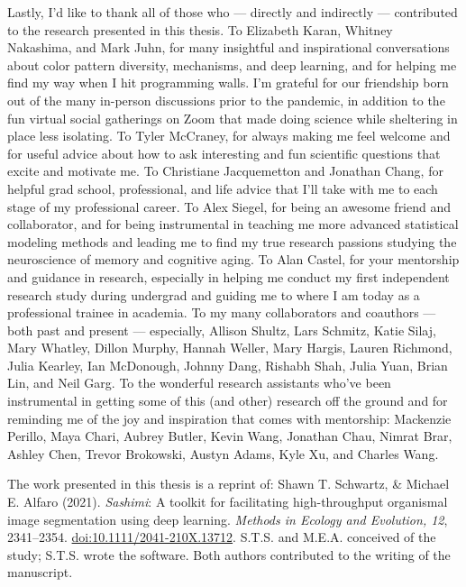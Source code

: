{Lastly, I'd like to thank all of those who --- directly and indirectly --- contributed to the research presented in this thesis. To Elizabeth Karan, Whitney Nakashima, and Mark Juhn, for many insightful and inspirational conversations about color pattern diversity, mechanisms, and deep learning, and for helping me find my way when I hit programming walls. I'm grateful for our friendship born out of the many in-person discussions prior to the pandemic, in addition to the fun virtual social gatherings on Zoom that made doing science while sheltering in place less isolating. To Tyler McCraney, for always making me feel welcome and for useful advice about how to ask interesting and fun scientific questions that excite and motivate me. To Christiane Jacquemetton and Jonathan Chang, for helpful grad school, professional, and life advice that I'll take with me to each stage of my professional career. To Alex Siegel, for being an awesome friend and collaborator, and for being instrumental in teaching me more advanced statistical modeling methods and leading me to find my true research passions studying the neuroscience of memory and cognitive aging. To Alan Castel, for your mentorship and guidance in research, especially in helping me conduct my first independent research study during undergrad and guiding me to where I am today as a professional trainee in academia. To my many collaborators and coauthors --- both past and present --- especially, Allison Shultz, Lars Schmitz, Katie Silaj, Mary Whatley, Dillon Murphy, Hannah Weller, Mary Hargis, Lauren Richmond, Julia Kearley, Ian McDonough, Johnny Dang, Rishabh Shah, Julia Yuan, Brian Lin, and Neil Garg. To the wonderful research assistants who've been instrumental in getting some of this (and other) research off the ground and for reminding me of the joy and inspiration that comes with mentorship: Mackenzie Perillo, Maya Chari, Aubrey Butler, Kevin Wang, Jonathan Chau, Nimrat Brar, Ashley Chen, Trevor Brokowski, Austyn Adams, Kyle Xu, and Charles Wang.

The work presented in this thesis is a reprint of: Shawn T. Schwartz, \& Michael E. Alfaro (2021). \emph{Sashimi}: A toolkit for facilitating high-throughput organismal image segmentation using deep learning. \textit{Methods in Ecology and Evolution, 12}, 2341–2354. \href{https://doi.org/10.1111/2041-210X.13712}{doi:10.1111/2041-210X.13712}. S.T.S. and M.E.A. conceived of the study; S.T.S. wrote the software. Both authors contributed to the writing of the manuscript.}